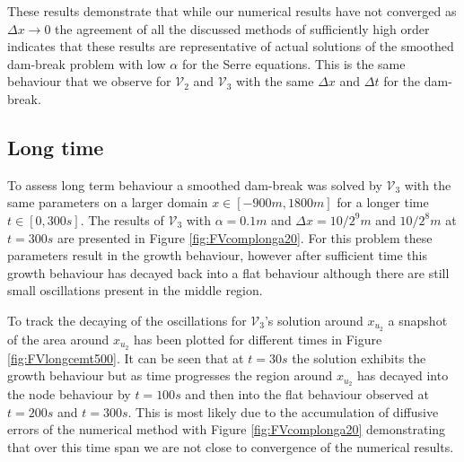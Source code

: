 \documentclass[times]{elsarticle}
\begin{document}
These results demonstrate that while our numerical results have not converged as $\Delta x \rightarrow 0$ the agreement of all the discussed methods of sufficiently high order indicates that these results are representative of actual solutions of the smoothed dam-break problem with low $\alpha$ for the Serre equations. This is the same behaviour that we observe for $\mathcal{V}_2$ and $\mathcal{V}_3$ with the same $\Delta x$ and $\Delta t$ for the dam-break.


\subsection{Long time}\label{subsubsec:LT}
To assess long term behaviour a smoothed dam-break was solved by $\mathcal{V}_3$ with the same parameters on a larger domain $x \in [-900m, 1800m]$ for a longer time $t \in [0,300s]$. The results of $\mathcal{V}_3$ with $\alpha = 0.1m$ and $\Delta x = 10/2^{9}m$ and $10/2^{8}m$ at $t = 300s$ are presented in Figure \ref{fig:FVcomplonga20}. For this problem these parameters result in the growth behaviour, however after sufficient time this growth behaviour has decayed back into a flat behaviour although there are still small oscillations present in the middle region. 

To track the decaying of the oscillations for $\mathcal{V}_3$'s solution around $x_{u_2}$ a snapshot of the area around $x_{u_2}$ has been plotted for different times in Figure \ref{fig:FVlongcemt500}. It can be seen that at $t =30s$ the solution exhibits the growth behaviour but as time progresses the region around $x_{u_2}$ has decayed into the node behaviour by $t=100s$ and then into the flat behaviour observed at $t=200s$ and $t=300s$. This is most likely due to the accumulation of diffusive errors of the numerical method with Figure \ref{fig:FVcomplonga20} demonstrating that over this time span we are not close to convergence of the numerical results.   
\end{document}
